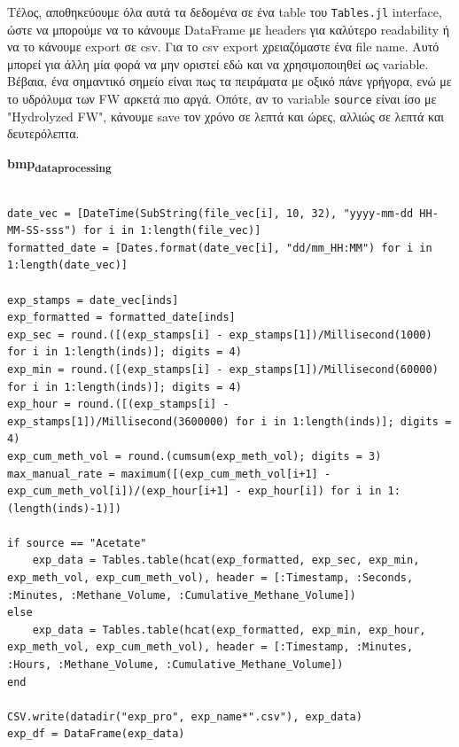 \documentclass[11pt]{article}
\begin{document}
Τέλος, αποθηκεύουμε όλα αυτά τα δεδομένα σε ένα table του \texttt{Tables.jl} interface, ώστε να μπορούμε να το κάνουμε DataFrame με headers για καλύτερο readability ή να το κάνουμε export σε csv. Για το csv export χρειαζόμαστε ένα file name. Αυτό μπορεί για άλλη μία φορά να μην οριστεί εδώ και να χρησιμοποιηθεί ως variable. Βέβαια, ένα σημαντικό σημείο είναι πως τα πειράματα με οξικό πάνε γρήγορα, ενώ με το υδρόλυμα των FW αρκετά πιο αργά. Οπότε, αν το variable \texttt{source} είναι ίσο με "Hydrolyzed FW", κάνουμε save τον χρόνο σε λεπτά και ώρες, αλλιώς σε λεπτά και δευτερόλεπτα.

\textbf{bmp\textsubscript{data}\textsubscript{processing}}
\begin{verbatim}

date_vec = [DateTime(SubString(file_vec[i], 10, 32), "yyyy-mm-dd HH-MM-SS-sss") for i in 1:length(file_vec)]
formatted_date = [Dates.format(date_vec[i], "dd/mm_HH:MM") for i in 1:length(date_vec)]

exp_stamps = date_vec[inds]
exp_formatted = formatted_date[inds]
exp_sec = round.([(exp_stamps[i] - exp_stamps[1])/Millisecond(1000) for i in 1:length(inds)]; digits = 4)
exp_min = round.([(exp_stamps[i] - exp_stamps[1])/Millisecond(60000) for i in 1:length(inds)]; digits = 4)
exp_hour = round.([(exp_stamps[i] - exp_stamps[1])/Millisecond(3600000) for i in 1:length(inds)]; digits = 4)
exp_cum_meth_vol = round.(cumsum(exp_meth_vol); digits = 3)
max_manual_rate = maximum([(exp_cum_meth_vol[i+1] - exp_cum_meth_vol[i])/(exp_hour[i+1] - exp_hour[i]) for i in 1:(length(inds)-1)])

if source == "Acetate"
    exp_data = Tables.table(hcat(exp_formatted, exp_sec, exp_min, exp_meth_vol, exp_cum_meth_vol), header = [:Timestamp, :Seconds, :Minutes, :Methane_Volume, :Cumulative_Methane_Volume])
else
    exp_data = Tables.table(hcat(exp_formatted, exp_min, exp_hour, exp_meth_vol, exp_cum_meth_vol), header = [:Timestamp, :Minutes, :Hours, :Methane_Volume, :Cumulative_Methane_Volume])
end

CSV.write(datadir("exp_pro", exp_name*".csv"), exp_data)
exp_df = DataFrame(exp_data)

\end{verbatim}
\end{document}

